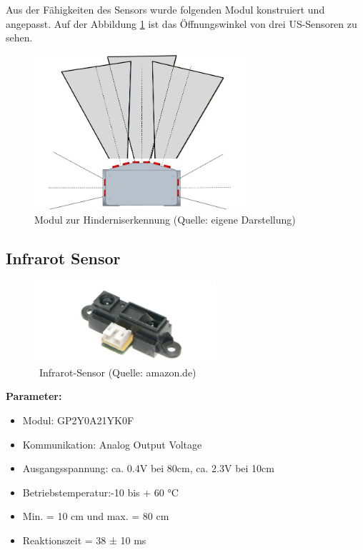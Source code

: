 Aus der Fähigkeiten des Sensors wurde folgenden Modul konstruiert und angepasst. Auf der Abbildung \ref{H-Mod} ist das Öffnungswinkel von drei US-Sensoren zu sehen.

\begin{figure}[!h]  %
	\centering\includegraphics[width=0.7\textwidth]{images/H-Mod.jpg}
	\caption{Modul zur Hinderniserkennung (Quelle: eigene Darstellung)}
	\label{H-Mod} %
\end{figure}


\pagebreak
\subsection{ Infrarot Sensor  }
\begin{figure}[!h]  %
	\centering\includegraphics[width=0.6\textwidth]{images/infrarot.png}
	\caption{ \ Infrarot-Sensor  (Quelle: amazon.de)}
	\label{infrarot} %
\end{figure}

\textbf{Parameter:}  %

\begin{itemize}
	\item Modul: GP2Y0A21YK0F
	\item Kommunikation: Analog Output Voltage 
	\item Ausgangsspannung: ca. 0.4V bei 80cm, ca. 2.3V bei 10cm
	\item Betriebstemperatur:-10 bis + 60 °C
	\item Min. = 10 cm und max. = 80 cm
	\item Reaktionszeit = 38 ± 10 ms
\end{itemize}

